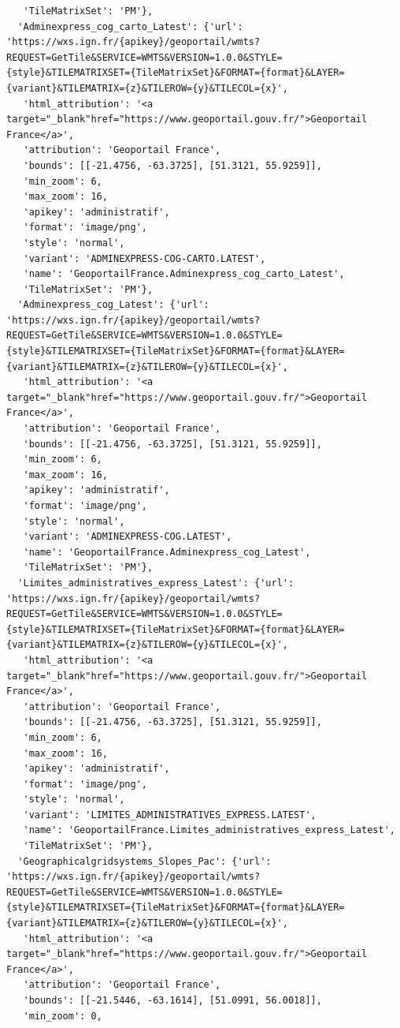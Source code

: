 \documentclass[
  letterpaper,
  DIV=11,
  numbers=noendperiod]{scrreprt}
\begin{document}
\begin{verbatim}
   'TileMatrixSet': 'PM'},
  'Adminexpress_cog_carto_Latest': {'url': 'https://wxs.ign.fr/{apikey}/geoportail/wmts?REQUEST=GetTile&SERVICE=WMTS&VERSION=1.0.0&STYLE={style}&TILEMATRIXSET={TileMatrixSet}&FORMAT={format}&LAYER={variant}&TILEMATRIX={z}&TILEROW={y}&TILECOL={x}',
   'html_attribution': '<a target="_blank"href="https://www.geoportail.gouv.fr/">Geoportail France</a>',
   'attribution': 'Geoportail France',
   'bounds': [[-21.4756, -63.3725], [51.3121, 55.9259]],
   'min_zoom': 6,
   'max_zoom': 16,
   'apikey': 'administratif',
   'format': 'image/png',
   'style': 'normal',
   'variant': 'ADMINEXPRESS-COG-CARTO.LATEST',
   'name': 'GeoportailFrance.Adminexpress_cog_carto_Latest',
   'TileMatrixSet': 'PM'},
  'Adminexpress_cog_Latest': {'url': 'https://wxs.ign.fr/{apikey}/geoportail/wmts?REQUEST=GetTile&SERVICE=WMTS&VERSION=1.0.0&STYLE={style}&TILEMATRIXSET={TileMatrixSet}&FORMAT={format}&LAYER={variant}&TILEMATRIX={z}&TILEROW={y}&TILECOL={x}',
   'html_attribution': '<a target="_blank"href="https://www.geoportail.gouv.fr/">Geoportail France</a>',
   'attribution': 'Geoportail France',
   'bounds': [[-21.4756, -63.3725], [51.3121, 55.9259]],
   'min_zoom': 6,
   'max_zoom': 16,
   'apikey': 'administratif',
   'format': 'image/png',
   'style': 'normal',
   'variant': 'ADMINEXPRESS-COG.LATEST',
   'name': 'GeoportailFrance.Adminexpress_cog_Latest',
   'TileMatrixSet': 'PM'},
  'Limites_administratives_express_Latest': {'url': 'https://wxs.ign.fr/{apikey}/geoportail/wmts?REQUEST=GetTile&SERVICE=WMTS&VERSION=1.0.0&STYLE={style}&TILEMATRIXSET={TileMatrixSet}&FORMAT={format}&LAYER={variant}&TILEMATRIX={z}&TILEROW={y}&TILECOL={x}',
   'html_attribution': '<a target="_blank"href="https://www.geoportail.gouv.fr/">Geoportail France</a>',
   'attribution': 'Geoportail France',
   'bounds': [[-21.4756, -63.3725], [51.3121, 55.9259]],
   'min_zoom': 6,
   'max_zoom': 16,
   'apikey': 'administratif',
   'format': 'image/png',
   'style': 'normal',
   'variant': 'LIMITES_ADMINISTRATIVES_EXPRESS.LATEST',
   'name': 'GeoportailFrance.Limites_administratives_express_Latest',
   'TileMatrixSet': 'PM'},
  'Geographicalgridsystems_Slopes_Pac': {'url': 'https://wxs.ign.fr/{apikey}/geoportail/wmts?REQUEST=GetTile&SERVICE=WMTS&VERSION=1.0.0&STYLE={style}&TILEMATRIXSET={TileMatrixSet}&FORMAT={format}&LAYER={variant}&TILEMATRIX={z}&TILEROW={y}&TILECOL={x}',
   'html_attribution': '<a target="_blank"href="https://www.geoportail.gouv.fr/">Geoportail France</a>',
   'attribution': 'Geoportail France',
   'bounds': [[-21.5446, -63.1614], [51.0991, 56.0018]],
   'min_zoom': 0,

\end{verbatim}
\end{document}
